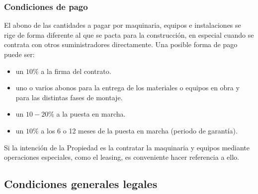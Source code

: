 \documentclass[../main.tex]{subfiles}
\begin{document}
\subsubsection{Condiciones de pago}
El abono de las cantidades a pagar por maquinaria, equipos e instalaciones se rige de forma diferente al que se pacta para la construcción, en especial cuando se contrata con otros suministradores directamente. Una posible forma de pago puede ser: 
\begin{itemize}
    \item un $10\%$ a la firma del contrato. 
    \item uno o varios abonos para la entrega de los materiales o equipos en obra y para las distintas fases de montaje.
    \item un $10-20\%$ a la puesta en marcha. 
    \item  un $10\%$ a los 6 o 12 meses de la puesta en marcha (periodo de garantía).
\end{itemize}
Si la intención de la Propiedad es la contratar la maquinaria y equipos mediante operaciones especiales, como el leasing, es conveniente hacer referencia a ello. 

\subsection{Condiciones generales legales}
\end{document}

